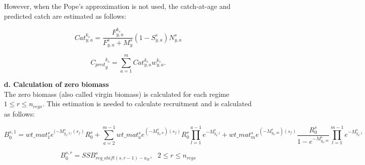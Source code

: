 \documentclass{article}
\begin{document}
However, when the Pope's approximation is not used, the catch-at-age and predicted catch are estimated as follows:

\begin{equation}
Cat^{k_s}_{y,a}=\dfrac{F^{k_s}_{y,a}}{F^s_{y,a}+M^{s}_{y}}\left(1-S^s_{y,a}\right)N^s_{y,a}
\end{equation}


\begin{equation}
{C_{pred}}^{k_s}_y=\sum_{a=1}^{m}Cat^{k_s}_{y,a} w_{y,a}^{k_s}.
\end{equation}



\hfill

\textbf{d. Calculation of zero biomass}\\

The zero biomass (also called virgin biomass) is calculated for each regime $1\leq r \leq  n_{regs}$. This estimation is needed to calculate recruitment and is calculated as follows:


\begin{equation}
    B^{s,1}_0=wt\_{mat}^s_1e^{(-M^s_{y_0,1)}(s_f)}R^s_0
  +\sum_{a=2}^{m-1}wt\_{mat}^s_ae^{(-M^s_{y_0,a})(s_f)}R^s_0\prod_{l=1}^{a-1}e^{-M^s_{y_0,l}} 
+ wt\_{mat}^s_{m}e^{(-M^s_{y_0,m})(s_f)}\frac{R^s_0}{1-e^{-M^s_{y_0,m}}}\prod_{l=1}^{m-1}e^{-M^s_{y_0,l}}
\end{equation}

\begin{equation}
    B^{s,r}_0 = SSB^s_{reg\_shift(s,r-1)-a_R}, \ \ \ 2\leq r \leq n_{regs}
\end{equation}
\end{document}
